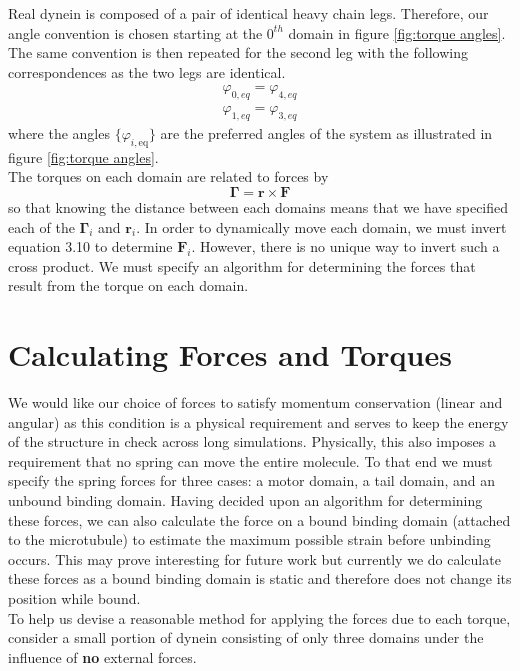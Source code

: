 	
	Real dynein is composed of a pair of identical heavy chain legs. Therefore, our angle convention is chosen starting at the $0^{th}$ domain in figure \ref{fig:torque angles}. The same convention is then repeated for the second leg with the following correspondences as the two legs are identical. 
	\begin{align}
		\varphi_{0,eq} = \varphi_{4,eq} \\ 
		\varphi_{1,eq} = \varphi_{3,eq}
	\end{align}
	where the angles $\{\varphi_{i, \text{eq}}\}$ are the preferred angles of the system as illustrated in figure \ref{fig:torque angles}.\\
	
	 The torques on each domain are related to forces by 
	\begin{equation}
		\mathbf{\Gamma} = \mathbf{r}\times\mathbf{F}
	\end{equation}
	so that knowing the distance between each domains means that we have specified each of the $\mathbf{\Gamma}_i$ and $\mathbf{r}_i$. In order to dynamically move each domain, we must invert equation 3.10 to determine $\mathbf{F}_i$. However, there is no unique way to invert such a cross product. We must specify an algorithm for determining the forces that result from the torque on each domain. 
	
	\section{Calculating Forces and Torques}
	We would like our choice of forces to satisfy momentum conservation (linear and angular) as this condition is a physical requirement and serves to keep the energy of the structure in check across long simulations. Physically, this also imposes a requirement that no spring can move the entire molecule. To that end we must specify the spring forces for three cases: a motor domain, a tail domain, and an unbound binding domain. Having decided upon an algorithm for determining these forces, we can also calculate the force on a bound binding domain (attached to the microtubule) to estimate the maximum possible strain before unbinding occurs. This may prove interesting for future work but currently we do calculate these forces as a bound binding domain is static and therefore does not change its position while bound. \\ 
	
	To help us devise a reasonable method for applying the forces due to each torque, consider a small portion of dynein consisting of only three domains under the influence of \textbf{no} external forces. \\
	
